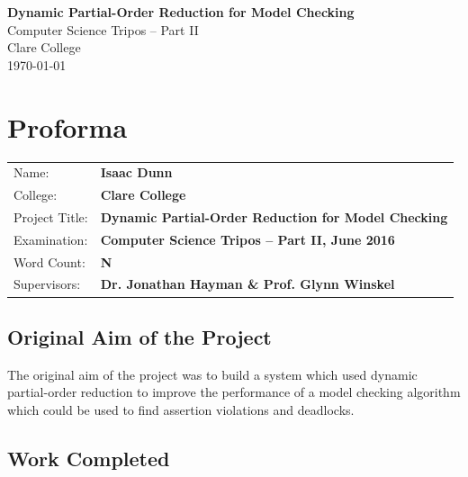 \documentclass[12pt,a4paper,twoside,openright]{report}
\begin{document}





\pagestyle{empty}


\vspace*{60mm}
\begin{center}
\Huge
\textbf{Dynamic Partial-Order Reduction for Model Checking} \\[7mm]
Computer Science Tripos -- Part II \\[6mm]
Clare College \\[7mm]
\LARGE \today  %
\end{center}


\pagestyle{plain}

\chapter*{Proforma}

{\large
\begin{tabular}{ll}
Name:           & \bf Isaac Dunn                            			 \\
College:        & \bf Clare College                    				     \\
Project Title:	& \bf Dynamic Partial-Order Reduction for Model Checking \\
Examination:    & \bf Computer Science Tripos -- Part II, June 2016      \\
Word Count:     & \bf N    \\
Supervisors:	& \bf Dr. Jonathan Hayman \& Prof. Glynn Winskel             \\ 
\end{tabular}
}


\section*{Original Aim of the Project}

The original aim of the project was to build a system which
used dynamic partial-order reduction to improve the performance
of a model checking algorithm which could be used to find
assertion violations and deadlocks.

\section*{Work Completed}
\end{document}
